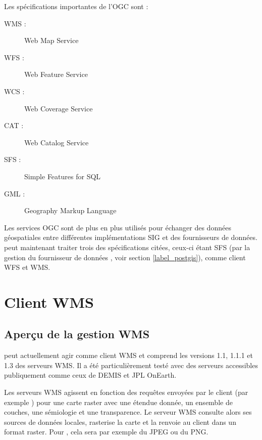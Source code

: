 Les spécifications importantes de l'OGC sont :

\begin{description}
\item[WMS :] Web Map Service
\item[WFS :] Web Feature Service
\item[WCS :] Web Coverage Service
\item[CAT :] Web Catalog Service
\item[SFS :] Simple Features for SQL
\item[GML :] Geography Markup Language
\end{description}

Les services OGC sont de plus en plus utilisés pour échanger des données géospatiales entre différentes implémentations SIG et des fournisseurs de données. \qg peut maintenant traiter trois des spécifications citées, ceux-ci étant SFS (par la gestion du fournisseur de données \ppg, voir section \ref{label_postgis}), comme client WFS et WMS.

\section{Client WMS}\label{sec:ogc-wms}

\subsection{Aperçu de la gestion WMS}\label{sec:ogc-wms-about}

\qg peut actuellement agir comme client WMS et comprend les versions 1.1, 1.1.1 et 1.3 des serveurs WMS. Il a été particulièrement testé avec des serveurs accessibles publiquement comme ceux de DEMIS et JPL OnEarth.

Les serveurs WMS agissent en fonction des requêtes envoyées par le client (par exemple \qg) pour une carte raster avec une étendue donnée, un ensemble de couches, une sémiologie et une transparence. Le serveur WMS consulte alors ses sources de données locales, rasterise la carte et la renvoie au client dans un format raster. Pour \qg, cela sera par exemple du JPEG ou du PNG.

